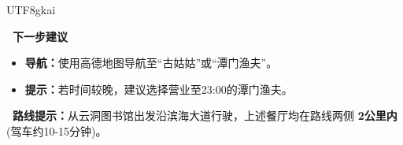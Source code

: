 \documentclass{article} %
\begin{document}
\begin{CJK*}{UTF8}{gkai}
\begin{tcolorbox}[
    breakable,
    enhanced,
    colframe=color_amapblue,
    colback=mycolor,
    coltitle=white,
    title = {\textbf{Case Study: Route-based Dining Recommendation}},
    fonttitle=\bfseries
]
\begin{tcolorbox}[colback=white, colframe=color_amapblue!30!white, arc=4pt, boxrule=1pt, left=4pt, right=4pt, top=4pt, bottom=4pt]
    \textbf{\textcolor{color_amapblue}{\faMapMarker*\ 下一步建议}}
    \begin{itemize}[leftmargin=12pt, itemsep=0pt, topsep=2pt]
        \item \textbf{导航：}使用高德地图导航至“古姑姑”或“潭门渔夫”。
        \item \textbf{提示：}若时间较晚，建议选择营业至23:00的潭门渔夫。
    \end{itemize}
    
    \vspace{3pt}
    
    \colorbox{color_amapgrey}{\parbox{\dimexpr\linewidth-6pt}{
        \scriptsize 
        \textbf{\faCar\ 路线提示：}从云洞图书馆出发沿滨海大道行驶，上述餐厅均在路线两侧 \textbf{2公里内} (驾车约10-15分钟)。
    }}
\end{tcolorbox}

\end{tcolorbox}






\end{CJK*}
\end{document}
